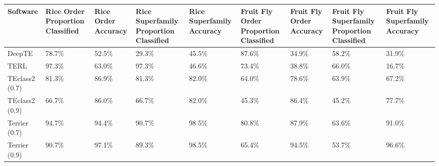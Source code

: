 \begin{tabular}{lllllllll}
\toprule
Software & Rice Order Proportion Classified & Rice Order Accuracy & Rice Superfamily Proportion Classified & Rice Superfamily Accuracy & Fruit Fly Order Proportion Classified & Fruit Fly Order Accuracy & Fruit Fly Superfamily Proportion Classified & Fruit Fly Superfamily Accuracy \\
\midrule
DeepTE & 78.7\% & 52.5\% & 29.3\% & 45.5\% & 87.6\% & 34.9\% & 58.2\% & 31.9\% \\
TERL & 97.3\% & 63.0\% & 97.3\% & 46.6\% & 73.4\% & 38.8\% & 66.0\% & 16.7\% \\
TEclass2 (0.7) & 81.3\% & 86.9\% & 81.3\% & 82.0\% & 64.0\% & 78.6\% & 63.9\% & 67.2\% \\
TEclass2 (0.9) & 66.7\% & 86.0\% & 66.7\% & 82.0\% & 45.3\% & 86.4\% & 45.2\% & 77.7\% \\
Terrier (0.7) & 94.7\% & 94.4\% & 90.7\% & 98.5\% & 80.8\% & 87.9\% & 63.6\% & 91.0\% \\
Terrier (0.9) & 90.7\% & 97.1\% & 89.3\% & 98.5\% & 65.4\% & 94.5\% & 53.7\% & 96.6\% \\
\bottomrule
\end{tabular}

